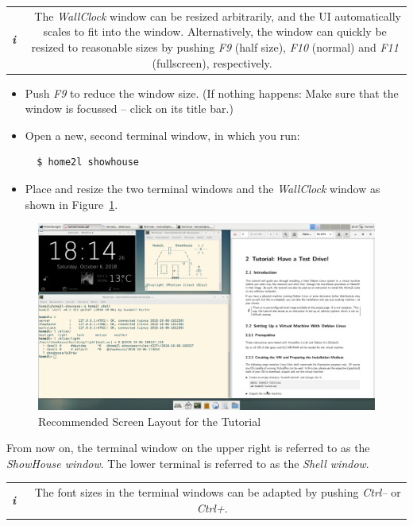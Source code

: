 \documentclass[12pt,english,parskip=half]{scrreprt}
\newcommand{\infobox}[1]{
  \hfill
  \setlength\arrayrulewidth{1pt}
  \begin{tabular}[t]{c|c|}
    \parbox{1.8em}{\hfill\textit{\Huge\textbf{i}\,}}
    &
    \,\parbox{0.89\linewidth}{\setlength{\parskip}{0.5em}#1}\,
  \end{tabular}
  \par
}
\begin{document}
\infobox{
  The \emph{WallClock} window can be resized arbitrarily, and the UI automatically
  scales to fit into the window. Alternatively, the window can quickly be resized to
  reasonable sizes by pushing \textit{F9} (half size), \textit{F10} (normal) and
  \textit{F11} (fullscreen), respectively.
}


\begin{itemize}[$\blacktriangleright$]

\item
  Push \emph{F9} to reduce the window size. (If nothing happens: Make
  sure that the window is focussed -- click on its title bar.)

\item
  Open a new, second terminal window, in which you run:
  \begin{lstlisting}
  $ home2l showhouse
  \end{lstlisting}

\item
  Place and resize the two terminal windows and the \emph{WallClock} window
  as shown in Figure~\ref{fig:screen-layout}.

\end{itemize}


\begin{figure}[ht]
  \centering
  \includegraphics[width=0.95\linewidth,keepaspectratio]{figs/screen-tutorial_layout}
  \caption[l]{Recommended Screen Layout for the Tutorial}
  \label{fig:screen-layout}
\end{figure}


From now on, the terminal window on the upper right is referred to as
the \emph{ShowHouse window}. The lower terminal is referred to as the
\emph{Shell window}.

\infobox{
  The font sizes in the terminal windows can be adapted by pushing \textit{Ctrl--} or \textit{Ctrl+}.
}
\end{document}
